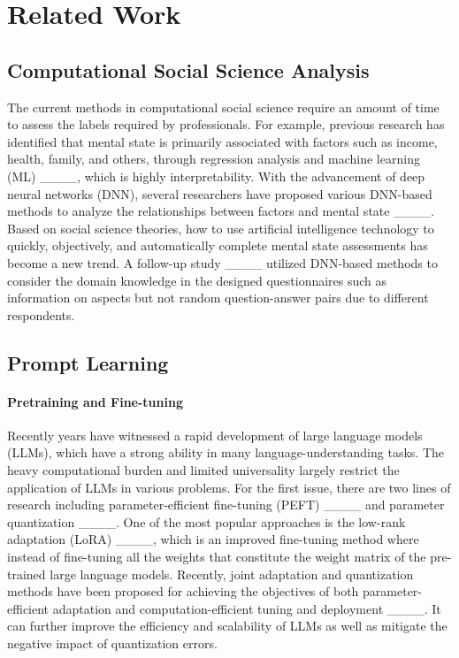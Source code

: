 \section{Related Work}
\subsection{Computational Social Science Analysis}
The current methods in computational social science require an amount of time to assess the labels required by professionals. For example, previous research has identified that mental state is primarily associated with factors such as income, health, family, and others, through regression analysis and machine learning (ML) ____, which is highly interpretability. With the advancement of deep neural networks (DNN), several researchers have proposed various DNN-based methods to analyze the relationships between factors and mental state ____. Based on social science theories, how to use artificial intelligence technology to quickly, objectively, and automatically complete mental state assessments has become a new trend. A follow-up study ____ utilized DNN-based methods to consider the domain knowledge in the designed questionnaires such as information on aspects but not random question-answer pairs due to different respondents. 

\subsection{Prompt Learning}


\paragraph{Pretraining and Fine-tuning}
Recently years have witnessed a rapid development of large language models (LLMs), which have a strong ability in many language-understanding tasks. The heavy computational burden and limited universality largely restrict the application of LLMs in various problems. For the first issue, there are two lines of research including parameter-efficient fine-tuning (PEFT) ____ and parameter quantization ____. One of the most popular approaches is the low-rank adaptation (LoRA) ____, which is an improved fine-tuning method where instead of fine-tuning all the weights that constitute the weight matrix of the pre-trained large language models. Recently, joint adaptation and quantization methods have been proposed for achieving the objectives of both parameter-efficient adaptation and computation-efficient tuning and deployment ____. It can further improve the efficiency and scalability of LLMs as well as mitigate the negative impact of quantization errors. 

